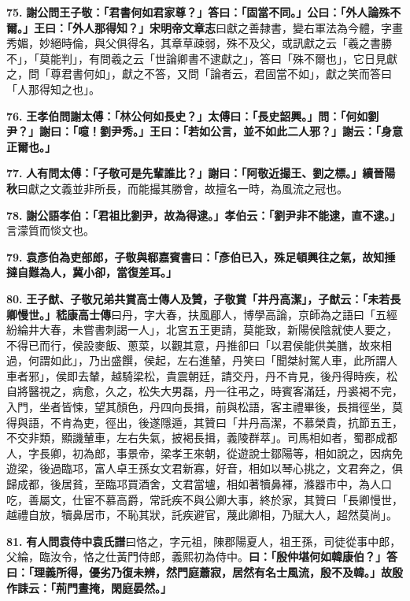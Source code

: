 \textbf{75.} \textbf{謝公問王子敬：「君書何如君家尊？」答曰：「固當不同。」公曰：「外人論殊不爾。」王曰：「外人那得知？」}{\footnotesize \textbf{宋明帝文章志}曰獻之善隸書，變右軍法為今體，字畫秀媚，妙絕時倫，與父俱得名，其章草疎弱，殊不及父，或訊獻之云「羲之書勝不」，「莫能判」，有問羲之云「世論卿書不逮獻之」，答曰「殊不爾也」，它日見獻之，問「尊君書何如」，獻之不答，又問「論者云，君固當不如」，獻之笑而答曰「人那得知之也」。}

\textbf{76.} \textbf{王孝伯問謝太傅：「林公何如長史？」太傅曰：「長史韶興。」問：「何如劉尹？」謝曰：「噫！劉尹秀。」王曰：「若如公言，並不如此二人邪？」謝云：「身意正爾也。」}

\textbf{77.} \textbf{人有問太傅：「子敬可是先輩誰比？」謝曰：「阿敬近撮王、劉之標。」}{\footnotesize \textbf{續晉陽秋}曰獻之文義並非所長，而能撮其勝會，故擅名一時，為風流之冠也。}

\textbf{78.} \textbf{謝公語孝伯：「君祖比劉尹，故為得逮。」孝伯云：「劉尹非不能逮，直不逮。」}{\footnotesize 言濛質而惔文也。}

\textbf{79.} \textbf{袁彥伯為吏部郎，子敬與郗嘉賓書曰：「彥伯已入，殊足頓興往之氣，故知捶撻自難為人，冀小卻，當復差耳。」}

\textbf{80.} \textbf{王子猷、子敬兄弟共賞高士傳人及贊，子敬賞「井丹高潔」，子猷云：「未若長卿慢世。」}{\footnotesize \textbf{嵇康高士傳}曰丹，字大春，扶風郿人，博學高論，京師為之語曰「五經紛綸井大春，未嘗書刺謁一人」，北宮五王更請，莫能致，新陽侯陰就使人要之，不得已而行，侯設麥飯、蔥菜，以觀其意，丹推卻曰「以君侯能供美膳，故來相過，何謂如此」，乃出盛饌，侯起，左右進輦，丹笑曰「聞桀紂駕人車，此所謂人車者邪」，侯即去輦，越騎梁松，貴震朝廷，請交丹，丹不肯見，後丹得時疾，松自將醫視之，病愈，久之，松失大男磊，丹一往弔之，時賓客滿廷，丹裘褐不完，入門，坐者皆悚，望其顏色，丹四向長揖，前與松語，客主禮畢後，長揖徑坐，莫得與語，不肯為吏，徑出，後遂隱遁，其贊曰「井丹高潔，不慕榮貴，抗節五王，不交非類，顯譏輦車，左右失氣，披褐長揖，義陵群萃」。司馬相如者，蜀郡成都人，字長卿，初為郎，事景帝，梁孝王來朝，從遊說士鄒陽等，相如說之，因病免遊梁，後過臨邛，富人卓王孫女文君新寡，好音，相如以琴心挑之，文君奔之，俱歸成都，後居貧，至臨邛買酒舍，文君當壚，相如著犢鼻褌，滌器市中，為人口吃，善屬文，仕宦不慕高爵，常託疾不與公卿大事，終於家，其贊曰「長卿慢世，越禮自放，犢鼻居市，不恥其狀，託疾避官，蔑此卿相，乃賦大人，超然莫尚」。}

\textbf{81.} \textbf{有人問袁侍中}{\footnotesize \textbf{袁氏譜}曰恪之，字元祖，陳郡陽夏人，祖王孫，司徒從事中郎，父綸，臨汝令，恪之仕黃門侍郎，義熙初為侍中。}\textbf{曰：「殷仲堪何如韓康伯？」答曰：「理義所得，優劣乃復未辨，然門庭蕭寂，居然有名士風流，殷不及韓。」故殷作誄云：「荊門晝掩，閑庭晏然。」}

